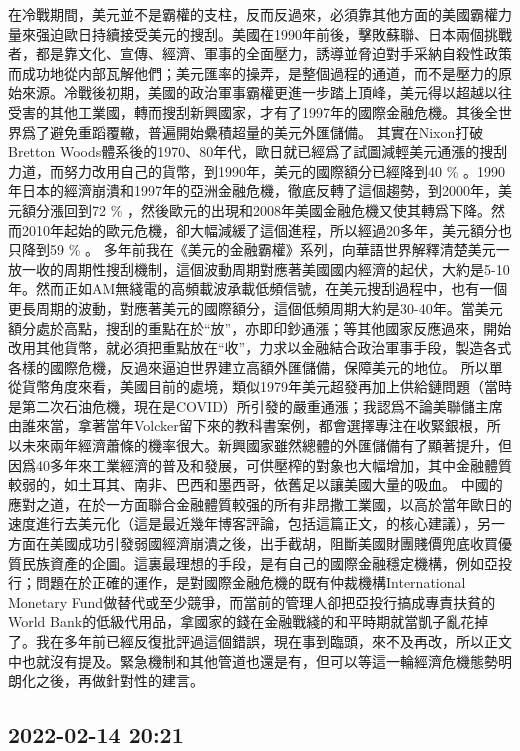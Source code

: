 \documentclass[twocolumn]{ctexart}
\begin{document}
在冷戰期間，美元並不是霸權的支柱，反而反過來，必須靠其他方面的美國霸權力量來强迫歐日持續接受美元的搜刮。美國在1990年前後，擊敗蘇聯、日本兩個挑戰者，都是靠文化、宣傳、經濟、軍事的全面壓力，誘導並脅迫對手采納自殺性政策而成功地從内部瓦解他們；美元匯率的操弄，是整個過程的通道，而不是壓力的原始來源。冷戰後初期，美國的政治軍事霸權更進一步踏上頂峰，美元得以超越以往受害的其他工業國，轉而搜刮新興國家，才有了1997年的國際金融危機。其後全世界爲了避免重蹈覆轍，普遍開始纍積超量的美元外匯儲備。
其實在Nixon打破Bretton Woods體系後的1970、80年代，歐日就已經爲了試圖減輕美元通漲的搜刮力道，而努力改用自己的貨幣，到1990年，美元的國際額分已經降到40 \% 。1990年日本的經濟崩潰和1997年的亞洲金融危機，徹底反轉了這個趨勢，到2000年，美元額分漲回到72 \% ，然後歐元的出現和2008年美國金融危機又使其轉爲下降。然而2010年起始的歐元危機，卻大幅減緩了這個進程，所以經過20多年，美元額分也只降到59 \% 。
多年前我在《美元的金融霸權》系列，向華語世界解釋清楚美元一放一收的周期性搜刮機制，這個波動周期對應著美國國内經濟的起伏，大約是5-10年。然而正如AM無綫電的高頻載波承載低頻信號，在美元搜刮過程中，也有一個更長周期的波動，對應著美元的國際額分，這個低頻周期大約是30-40年。當美元額分處於高點，搜刮的重點在於“放”，亦即印鈔通漲；等其他國家反應過來，開始改用其他貨幣，就必須把重點放在“收”，力求以金融結合政治軍事手段，製造各式各樣的國際危機，反過來逼迫世界建立高額外匯儲備，保障美元的地位。
所以單從貨幣角度來看，美國目前的處境，類似1979年美元超發再加上供給鏈問題（當時是第二次石油危機，現在是COVID）所引發的嚴重通漲；我認爲不論美聯儲主席由誰來當，拿著當年Volcker留下來的教科書案例，都會選擇專注在收緊銀根，所以未來兩年經濟蕭條的機率很大。新興國家雖然總體的外匯儲備有了顯著提升，但因爲40多年來工業經濟的普及和發展，可供壓榨的對象也大幅增加，其中金融體質較弱的，如土耳其、南非、巴西和墨西哥，依舊足以讓美國大量的吸血。
中國的應對之道，在於一方面聯合金融體質較强的所有非昂撒工業國，以高於當年歐日的速度進行去美元化（這是最近幾年博客評論，包括這篇正文，的核心建議），另一方面在美國成功引發弱國經濟崩潰之後，出手截胡，阻斷美國財團賤價兜底收買優質民族資產的企圖。這裏最理想的手段，是有自己的國際金融穩定機構，例如亞投行；問題在於正確的運作，是對國際金融危機的既有仲裁機構International Monetary Fund做替代或至少競爭，而當前的管理人卻把亞投行搞成專責扶貧的World Bank的低級代用品，拿國家的錢在金融戰綫的和平時期就當凱子亂花掉了。我在多年前已經反復批評過這個錯誤，現在事到臨頭，來不及再改，所以正文中也就沒有提及。緊急機制和其他管道也還是有，但可以等這一輪經濟危機態勢明朗化之後，再做針對性的建言。
\subsection*{2022-02-14 20:21}
\end{document}
